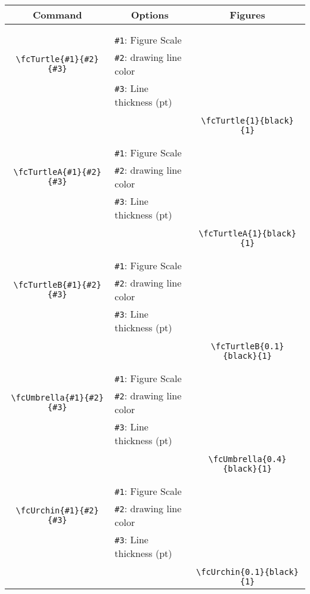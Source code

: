\documentclass[x11names]{article}
\begin{document}
\begin{table}[H]\centering\begin{tabular}{|c|l|c|}\hline {\bf Command}& \multicolumn{1}{c|}{{\bf Options}} & {\bf Figures}\\  \hline	&&\multirow{5}{*}{\fcTurtle{1}{black}{1}}\\	&&\\	&\verb|#1|: Figure Scale &\\	\verb|\fcTurtle{#1}{#2}{#3}|&	\verb|#2|: drawing line color &\\	&\verb|#3|: Line thickness (pt) &\\ &&\\&&	\verb|\fcTurtle{1}{black}{1}|\\\hline 	
	&&\multirow{5}{*}{\fcTurtleA{1}{black}{1}}\\	&&\\	&\verb|#1|: Figure Scale &\\	\verb|\fcTurtleA{#1}{#2}{#3}|&	\verb|#2|: drawing line color &\\	&\verb|#3|: Line thickness (pt) &\\ &&\\&&	\verb|\fcTurtleA{1}{black}{1}|\\\hline 	
	&&\multirow{5}{*}{\fcTurtleB{0.1}{black}{1}}\\	&&\\	&\verb|#1|: Figure Scale &\\	\verb|\fcTurtleB{#1}{#2}{#3}|&	\verb|#2|: drawing line color &\\	&\verb|#3|: Line thickness (pt) &\\ &&\\&&	\verb|\fcTurtleB{0.1}{black}{1}|\\\hline 	
	&&\multirow{5}{*}{\fcUmbrella{0.4}{black}{1}}\\	&&\\	&\verb|#1|: Figure Scale &\\	\verb|\fcUmbrella{#1}{#2}{#3}|&	\verb|#2|: drawing line color &\\	&\verb|#3|: Line thickness (pt) &\\ &&\\&&	\verb|\fcUmbrella{0.4}{black}{1}|\\\hline 	
	&&\multirow{5}{*}{\fcUrchin{0.1}{black}{1}}\\	&&\\	&\verb|#1|: Figure Scale &\\	\verb|\fcUrchin{#1}{#2}{#3}|&	\verb|#2|: drawing line color &\\	&\verb|#3|: Line thickness (pt) &\\ &&\\&&	\verb|\fcUrchin{0.1}{black}{1}|\\\hline 	

\end{tabular}
\end{table}
\end{document}
